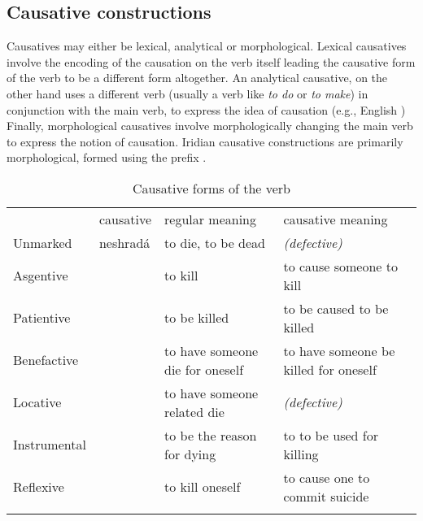 \subsection{Causative constructions}

Causatives may either be lexical, analytical or morphological. Lexical causatives involve the encoding of the causation on the verb itself leading the causative form of the verb to be a different form altogether. An analytical causative, on the other hand uses a different verb (usually a verb like \emph{to do} or \emph{to make}) in conjunction with the main verb, to express the idea of causation (e.g., English ) Finally, morphological causatives involve morphologically changing the main verb to express the notion of causation. Iridian causative constructions are primarily morphological, formed using the prefix .

\begin{table}
\footnotesize
\caption{Causative forms of the verb }
\medskip
	\label{tbl:causative}

    \begin{tabu}to \textwidth{Y[0.5]Y[0.6]YY}
         \toprule\addlinespace
		 										& {\sc causative } &{\sc regular meaning} & {\sc causative meaning}\\\addlinespace
												\midrule\addlinespace
				Unmarked				& neshradá									& to die, to be dead 	& \emph{(defective)} \\ \addlinespace
		 		Asgentive				& 			& to kill & to cause someone to kill\\ \addlinespace
		 		Patientive			& 					& to be killed & to be caused to be killed\\\addlinespace
				Benefactive			& 				& to have someone die for oneself	& to have someone be killed for oneself\\\addlinespace
				Locative				& 					& to have someone related die&\emph{(defective)}\\\addlinespace
				Instrumental		& &to be the reason for dying&to to be used for killing\\\addlinespace
				Reflexive				& &to kill oneself&to cause one to commit suicide\\
		 		\addlinespace
				\bottomrule

    \end{tabu}

\end{table}

